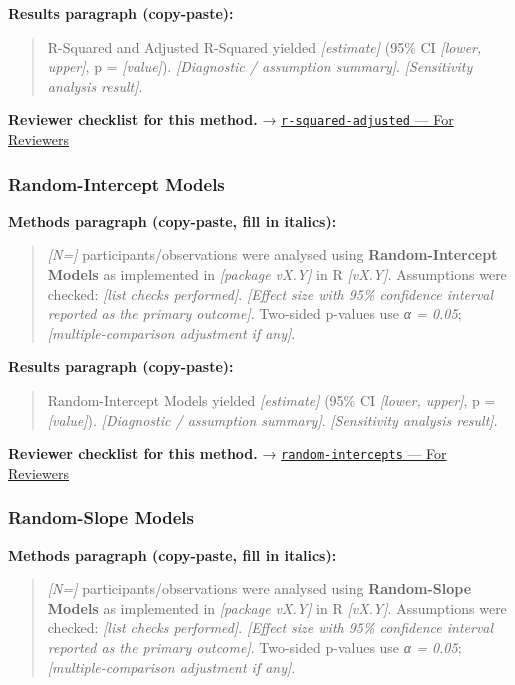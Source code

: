 \documentclass[
]{article}
\begin{document}
\textbf{Results paragraph (copy-paste):}

\begin{quote}
R-Squared and Adjusted R-Squared yielded \emph{{[}estimate{]}} (95\% CI
\emph{{[}lower, upper{]}}, p = \emph{{[}value{]}}). \emph{{[}Diagnostic
/ assumption summary{]}}. \emph{{[}Sensitivity analysis result{]}}.
\end{quote}

\textbf{Reviewer checklist for this method.} →
\href{../chapters/07-regression/r-squared-adjusted.Rmd\#for-reviewers}{\texttt{r-squared-adjusted}
--- For Reviewers}

\subsubsection{Random-Intercept Models}\label{random-intercept-models}

\textbf{Methods paragraph (copy-paste, fill in italics):}

\begin{quote}
\emph{{[}N={]}} participants/observations were analysed using
\textbf{Random-Intercept Models} as implemented in \emph{{[}package
vX.Y{]}} in R \emph{{[}vX.Y{]}}. Assumptions were checked: \emph{{[}list
checks performed{]}}. \emph{{[}Effect size with 95\% confidence interval
reported as the primary outcome{]}}. Two-sided p-values use \emph{α =
0.05}; \emph{{[}multiple-comparison adjustment if any{]}}.
\end{quote}

\textbf{Results paragraph (copy-paste):}

\begin{quote}
Random-Intercept Models yielded \emph{{[}estimate{]}} (95\% CI
\emph{{[}lower, upper{]}}, p = \emph{{[}value{]}}). \emph{{[}Diagnostic
/ assumption summary{]}}. \emph{{[}Sensitivity analysis result{]}}.
\end{quote}

\textbf{Reviewer checklist for this method.} →
\href{../chapters/07-regression/random-intercepts.Rmd\#for-reviewers}{\texttt{random-intercepts}
--- For Reviewers}

\subsubsection{Random-Slope Models}\label{random-slope-models}

\textbf{Methods paragraph (copy-paste, fill in italics):}

\begin{quote}
\emph{{[}N={]}} participants/observations were analysed using
\textbf{Random-Slope Models} as implemented in \emph{{[}package vX.Y{]}}
in R \emph{{[}vX.Y{]}}. Assumptions were checked: \emph{{[}list checks
performed{]}}. \emph{{[}Effect size with 95\% confidence interval
reported as the primary outcome{]}}. Two-sided p-values use \emph{α =
0.05}; \emph{{[}multiple-comparison adjustment if any{]}}.
\end{quote}
\end{document}

